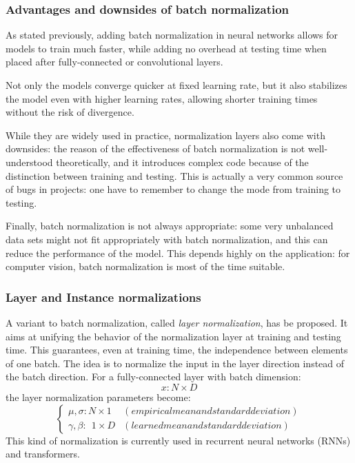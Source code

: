\subsubsection{Advantages and downsides of batch normalization}
As stated previously, adding batch normalization in neural networks allows for models to train much faster, while adding no overhead at testing time when placed after fully-connected or convolutional layers.

Not only the models converge quicker at fixed learning rate, but it also stabilizes the model even with higher learning rates, allowing shorter training times without the risk of divergence.

While they are widely used in practice, normalization layers also come with downsides: the reason of the effectiveness of batch normalization is not well-understood theoretically, and it introduces complex code because of the distinction between training and testing. This is actually a very common source of bugs in projects: one have to remember to change the mode from training to testing. 

Finally, batch normalization is not always appropriate: some very unbalanced data sets might not fit appropriately with batch normalization, and this can reduce the performance of the model. This depends highly on the application: for computer vision, batch normalization is most of the time suitable.

\subsubsection{Layer and Instance normalizations}
A variant to batch normalization, called \emph{layer normalization}, has be proposed. It aims at unifying the behavior of the normalization layer at training and testing time. This guarantees, even at training time, the independence between elements of one batch. The idea is to normalize the input in the layer direction instead of the batch direction. For a fully-connected layer with batch dimension:
\begin{equation*}
    x:N\times D
\end{equation*}
the layer normalization parameters become:
\begin{equation*}
    \begin{cases*}
        \mu, \sigma: N\times 1 & (empirical mean and standard deviation)\\
        \gamma, \beta: \;\,1\times D & (learned mean and standard deviation)
    \end{cases*}
\end{equation*}
This kind of normalization is currently used in recurrent neural networks (RNNs) and transformers.

